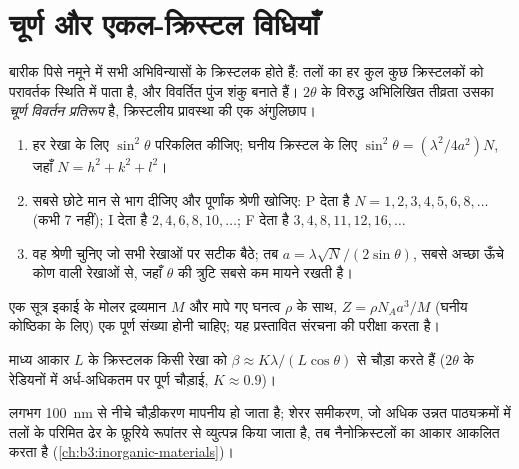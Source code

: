 \section{चूर्ण और एकल-क्रिस्टल विधियाँ}

\begin{definition}[चूर्ण विवर्तन प्रतिरूप]\label{def:b3:x-ray-diffraction:powder}
बारीक पिसे नमूने में सभी अभिविन्यासों के क्रिस्टलक होते हैं: तलों का हर
कुल कुछ क्रिस्टलकों को परावर्तक स्थिति में पाता है, और विवर्तित पुंज
शंकु बनाते हैं। $2\theta$ के विरुद्ध अभिलिखित तीव्रता उसका \emph{चूर्ण
विवर्तन प्रतिरूप} है, क्रिस्टलीय प्रावस्था की
एक अंगुलिछाप।
\end{definition}

\begin{method}[घनीय चूर्ण प्रतिरूप का सूचकांकन]\label{met:b3:x-ray-diffraction:index-cubic}
\begin{enumerate}
  \item हर रेखा के लिए $\sin^2\theta$ परिकलित कीजिए; घनीय क्रिस्टल के लिए $\sin^2\theta =
        (\lambda^2/4a^2)N$, जहाँ $N = h^2 + k^2 + l^2$।
  \item सबसे छोटे मान से भाग दीजिए और पूर्णांक श्रेणी खोजिए: P देता है
        $N = 1, 2, 3, 4, 5, 6, 8, \dots$ (कभी 7 नहीं); I देता है $2, 4, 6, 8, 10, \dots$; F देता है
        $3, 4, 8, 11, 12, 16, \dots$
  \item वह श्रेणी चुनिए जो सभी रेखाओं पर सटीक बैठे; तब $a = \lambda\sqrt N/(2\sin\theta)$, सबसे अच्छा
        ऊँचे कोण वाली रेखाओं से, जहाँ $\theta$ की त्रुटि सबसे कम मायने रखती है।
\end{enumerate}
\end{method}

\begin{method}[कोष्ठिका में सूत्र इकाइयों की संख्या]\label{met:b3:x-ray-diffraction:z-from-density}
एक सूत्र इकाई के मोलर द्रव्यमान $M$ और मापे गए घनत्व $\rho$ के साथ, $Z =
\rho N_Aa^3/M$ (घनीय कोष्ठिका के लिए) एक पूर्ण संख्या होनी चाहिए; यह प्रस्तावित
संरचना की परीक्षा करता है।
\end{method}

\begin{proposition}[शेरर समीकरण]\label{prop:b3:x-ray-diffraction:scherrer}
माध्य आकार $L$ के क्रिस्टलक किसी रेखा को $\beta \approx K\lambda/(L\cos\theta)$ से चौड़ा करते हैं
($2\theta$ के रेडियनों में अर्ध-अधिकतम पर पूर्ण चौड़ाई, $K \approx 0.9$)।
\end{proposition}
\admitted

लगभग \qty{100}{nm} से नीचे चौड़ीकरण मापनीय हो जाता है; शेरर
समीकरण, जो अधिक उन्नत पाठ्यक्रमों में तलों के परिमित ढेर के फ़ूरिये रूपांतर से
व्युत्पन्न किया जाता है, तब नैनोक्रिस्टलों का आकार आकलित करता है
(\cref{ch:b3:inorganic-materials})।

